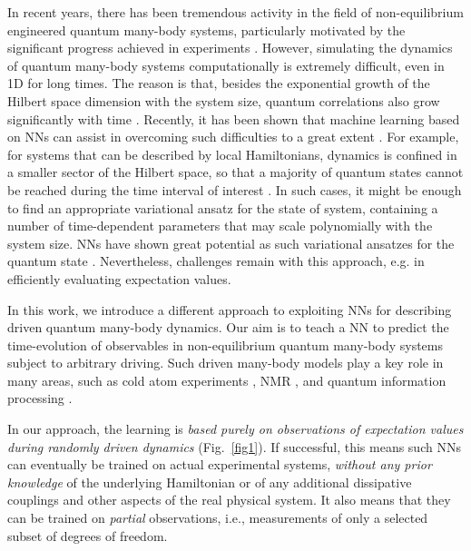 \documentclass[a4paper,aps,amsmath,amssymb,twocolumn,longbibliography,,accepted=2022-05-17]{quantumarticle}
\begin{document}
In recent years, there has been tremendous activity in the field of non-equilibrium engineered quantum many-body systems, particularly motivated by the significant progress achieved in experiments \cite{richerme2014non, greiner2002collapse, PhysRevLett.111.053003, kinoshita2006quantum,martinez2016real, richerme2014non,cheneau2012light}. However, simulating the dynamics of quantum many-body systems computationally is extremely difficult, even in 1D for long times. The reason is that, besides the exponential growth of the Hilbert space dimension with the system size, quantum correlations also grow significantly with time \cite{Calabrese_2005}. Recently, it has been shown that machine learning based on NNs can assist in overcoming such difficulties to a great extent \cite{carleo2017solving, schmitt2019quantum, lopez2019real}. For example, for systems that can be described by local Hamiltonians, dynamics is confined in a smaller sector of the Hilbert space, so that a majority of quantum states
cannot be reached during the time interval of interest \cite{PhysRevLett.106.170501}. In such cases, it might be enough to find an appropriate variational ansatz for the state of system, containing a number of time-dependent parameters that may scale polynomially with the system  size. NNs have shown great potential as such variational ansatzes for the quantum state \cite{carleo2017solving, gao2017efficient, schmitt2019quantum}. Nevertheless, challenges remain with this approach, e.g. in efficiently evaluating expectation values.



In this work, we introduce a different approach to exploiting NNs for describing driven quantum many-body dynamics.
Our aim is to teach a NN to predict the time-evolution of observables in non-equilibrium quantum many-body systems subject to arbitrary driving. Such driven many-body models play a key role in many areas, such as cold atom experiments \cite{struck2013engineering,RevModPhys.89.011004}, NMR \cite{foroozandeh2014ultrahigh,RevModPhys.76.1037}, and quantum information processing \cite{anderlini2007controlled}.

In our approach, the learning is \textit{based purely on observations of expectation values during randomly driven dynamics} (Fig.~\ref{fig1}). If successful, this means such NNs can eventually be trained on actual experimental systems, \textit{without any prior knowledge} of the underlying Hamiltonian or of any additional dissipative couplings and other aspects of the real physical system. It also means that they can be trained on \textit{partial} observations, i.e., measurements of only a selected subset of degrees of freedom.
\end{document}
